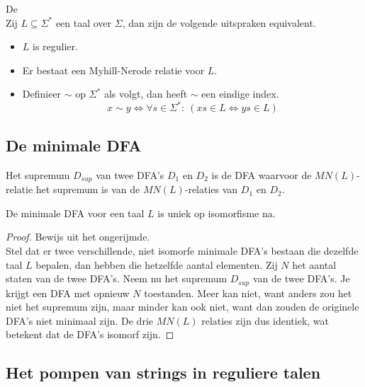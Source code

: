 \documentclass[main.tex]{subfiles}
\begin{document}
\begin{st}
  De \\
  Zij $L\subseteq \Sigma^{*}$ een taal over $\Sigma$, dan zijn de volgende uitspraken equivalent.
  \begin{itemize}
  \item $L$ is regulier.
  \item Er bestaat een Myhill-Nerode relatie voor $L$.
  \item Definieer $\sim$ op $\Sigma^{*}$ als volgt, dan heeft $\sim$ een eindige index.
    \[ x \sim y \Leftrightarrow \forall s \in \Sigma^{*}:\ (xs \in L \Leftrightarrow ys \in L) \]
  \end{itemize}
  \zb
\end{st}


\subsection{De minimale DFA}
\label{sec:de-minimale-dfa}

\begin{de}
  \label{de:supremum-dfas}
  Het supremum $D_{sup}$ van twee DFA's $D_{1}$ en $D_{2}$ is de DFA waarvoor de $MN(L)$-relatie het supremum is van de $MN(L)$-relaties van $D_{1}$ en $D_{2}$.
\end{de}

\begin{st}
  \label{st:minimale-dfa-uniek}
  De minimale DFA voor een taal $L$ is uniek op isomorfisme na.
  
  \begin{proof}
    Bewijs uit het ongerijmde.\\
    Stel dat er twee verschillende, niet isomorfe minimale DFA's bestaan die dezelfde taal $L$ bepalen, dan hebben die hetzelfde aantal elementen.
    Zij $N$ het aantal staten van de twee DFA's.
    Neem nu het supremum $D_{sup}$ van de twee DFA's.
    Je krijgt een DFA met opnieuw $N$ toestanden.
    Meer kan niet, want anders zou het niet het supremum zijn, maar minder kan ook niet, want dan zouden de originele DFA's niet minimaal zijn.
    De drie $MN(L)$ relaties zijn dus identiek, wat betekent dat de DFA's isomorf zijn.
  \end{proof}
\end{st}

\subsection{Het pompen van strings in reguliere talen}
\label{sec:het-pompend-van}
\end{document}
